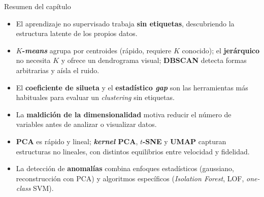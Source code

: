\documentclass[aspectratio=169]{beamer}
\begin{document}
\begin{frame}{Resumen del capítulo}
  \small
  \begin{itemize}
    \item El aprendizaje no supervisado trabaja \textbf{sin etiquetas}, descubriendo la estructura latente de los propios datos.
    \item \textbf{$K$-\textit{means}} agrupa por centroides (rápido, requiere $K$ conocido); el \textbf{jerárquico} no necesita $K$ y ofrece un dendrograma visual; \textbf{DBSCAN} detecta formas arbitrarias y aísla el ruido.
    \item El \textbf{coeficiente de silueta} y el \textbf{estadístico \textit{gap}} son las herramientas más habituales para evaluar un \textit{clustering} sin etiquetas.
    \item La \textbf{maldición de la dimensionalidad} motiva reducir el número de variables antes de analizar o visualizar datos.
    \item \textbf{PCA} es rápido y lineal; \textbf{\textit{kernel} PCA}, \textbf{$t$-SNE} y \textbf{UMAP} capturan estructuras no lineales, con distintos equilibrios entre velocidad y fidelidad.
    \item La detección de \textbf{anomalías} combina enfoques estadísticos (gaussiano, reconstrucción con PCA) y algoritmos específicos (\textit{Isolation Forest}, LOF, \textit{one-class} SVM).
  \end{itemize}
\end{frame}
\end{document}
